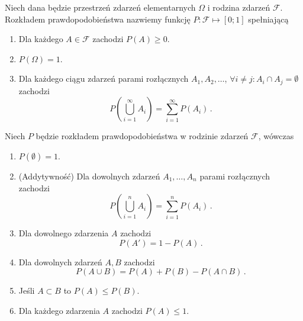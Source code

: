 \documentclass{myclass}
\numberwithin{equation}{section}
\begin{document}
\begin{definition}
Niech dana będzie przestrzeń zdarzeń elementarnych \(\Omega\) i rodzina zdarzeń \(\mathcal{F}\).
Rozkładem prawdopodobieństwa nazwiemy funkcję \(P: \mathcal{F} \mapsto [0;1]\) spełniającą
\begin{enumerate}
    
    \item Dla każdego \(A \in \mathcal{F}\) zachodzi \(P(A) \geq 0\).
    
    \item \(P(\Omega) = 1\).
    
    \item Dla każdego ciągu zdarzeń parami rozłącznych \(A_1,A_2,\ldots\), \(\forall i \neq j : A_i
    \cap A_j = \emptyset\) zachodzi
    \begin{equation*}
        P\left(\bigcup_{i=1}^\infty A_i\right) = \sum_{i=1}^\infty P(A_i)\,.
    \end{equation*}

\end{enumerate}
\end{definition}

\begin{theorem}
Niech \(P\) będzie rozkładem prawdopodobieństwa w rodzinie zdarzeń \(\mathcal{F}\), wówczas

\begin{enumerate}
    
    \item \(P(\emptyset) = 1\).
    
    \item (Addytywność) Dla dowolnych zdarzeń \(A_1,\ldots,A_n\) parami rozłącznych zachodzi
    \begin{equation*}
        P\left(\bigcup_{i=1}^n A_i\right) = \sum_{i=1}^n P(A_i)\,.
    \end{equation*}

    \item Dla dowolnego zdarzenia \(A\) zachodzi
    \begin{equation*}
        P(A') = 1 - P(A)\,.
    \end{equation*}

    \item Dla dowolnych zdarzeń \(A, B\) zachodzi
    \begin{equation*}
        P(A \cup B) = P(A) + P(B) - P(A \cap B)\,.
    \end{equation*}

    \item Jeśli \(A \subset B\) to \(P(A) \leq P(B)\).

    \item Dla każdego zdarzenia \(A\) zachodzi \(P(A) \leq 1\).

\end{enumerate}
\end{theorem}
\end{document}
